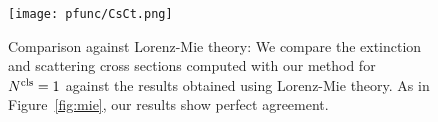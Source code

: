 \begin{figure}
    \centering
    \setlength{\resLen}{3in}
    \texttt{[image: pfunc/CsCt.png]} 
    \caption{
        Comparison against Lorenz-Mie theory: We compare the extinction and scattering cross sections computed with our method for ${N^\text{cls}}=1$ against the results obtained using Lorenz-Mie theory. As in Figure~\ref{fig:mie}, our results show perfect agreement. 
        \label{fig:mie2}
    }
\end{figure}
